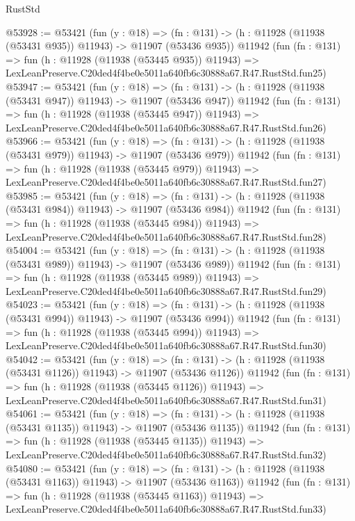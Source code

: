 \begin{lexlean}{RustStd}
\begin{coremodule}
@53928 := @53421
    (fun (y : @18) =>
    (fn : @131) -> (h : @11928 (@11938 (@53431 @935)) @11943) -> @11907 (@53436 @935))
    @11942
    (fun (fn : @131) =>
    fun (h : @11928 (@11938 (@53445 @935)) @11943) =>
    LexLeanPreserve.C20ded4f4be0e5011a640fb6c30888a67.R47.RustStd.fun25)
@53947 := @53421
    (fun (y : @18) =>
    (fn : @131) -> (h : @11928 (@11938 (@53431 @947)) @11943) -> @11907 (@53436 @947))
    @11942
    (fun (fn : @131) =>
    fun (h : @11928 (@11938 (@53445 @947)) @11943) =>
    LexLeanPreserve.C20ded4f4be0e5011a640fb6c30888a67.R47.RustStd.fun26)
@53966 := @53421
    (fun (y : @18) =>
    (fn : @131) -> (h : @11928 (@11938 (@53431 @979)) @11943) -> @11907 (@53436 @979))
    @11942
    (fun (fn : @131) =>
    fun (h : @11928 (@11938 (@53445 @979)) @11943) =>
    LexLeanPreserve.C20ded4f4be0e5011a640fb6c30888a67.R47.RustStd.fun27)
@53985 := @53421
    (fun (y : @18) =>
    (fn : @131) -> (h : @11928 (@11938 (@53431 @984)) @11943) -> @11907 (@53436 @984))
    @11942
    (fun (fn : @131) =>
    fun (h : @11928 (@11938 (@53445 @984)) @11943) =>
    LexLeanPreserve.C20ded4f4be0e5011a640fb6c30888a67.R47.RustStd.fun28)
@54004 := @53421
    (fun (y : @18) =>
    (fn : @131) -> (h : @11928 (@11938 (@53431 @989)) @11943) -> @11907 (@53436 @989))
    @11942
    (fun (fn : @131) =>
    fun (h : @11928 (@11938 (@53445 @989)) @11943) =>
    LexLeanPreserve.C20ded4f4be0e5011a640fb6c30888a67.R47.RustStd.fun29)
@54023 := @53421
    (fun (y : @18) =>
    (fn : @131) -> (h : @11928 (@11938 (@53431 @994)) @11943) -> @11907 (@53436 @994))
    @11942
    (fun (fn : @131) =>
    fun (h : @11928 (@11938 (@53445 @994)) @11943) =>
    LexLeanPreserve.C20ded4f4be0e5011a640fb6c30888a67.R47.RustStd.fun30)
@54042 := @53421
    (fun (y : @18) =>
    (fn : @131) -> (h : @11928 (@11938 (@53431 @1126)) @11943) -> @11907 (@53436 @1126))
    @11942
    (fun (fn : @131) =>
    fun (h : @11928 (@11938 (@53445 @1126)) @11943) =>
    LexLeanPreserve.C20ded4f4be0e5011a640fb6c30888a67.R47.RustStd.fun31)
@54061 := @53421
    (fun (y : @18) =>
    (fn : @131) -> (h : @11928 (@11938 (@53431 @1135)) @11943) -> @11907 (@53436 @1135))
    @11942
    (fun (fn : @131) =>
    fun (h : @11928 (@11938 (@53445 @1135)) @11943) =>
    LexLeanPreserve.C20ded4f4be0e5011a640fb6c30888a67.R47.RustStd.fun32)
@54080 := @53421
    (fun (y : @18) =>
    (fn : @131) -> (h : @11928 (@11938 (@53431 @1163)) @11943) -> @11907 (@53436 @1163))
    @11942
    (fun (fn : @131) =>
    fun (h : @11928 (@11938 (@53445 @1163)) @11943) =>
    LexLeanPreserve.C20ded4f4be0e5011a640fb6c30888a67.R47.RustStd.fun33)

\end{coremodule}
\end{lexlean}
